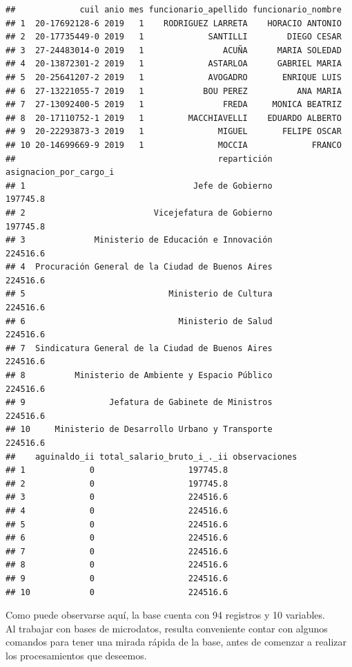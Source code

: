 \documentclass[]{book}
\begin{document}
\begin{verbatim}
##             cuil anio mes funcionario_apellido funcionario_nombre
## 1  20-17692128-6 2019   1    RODRIGUEZ LARRETA    HORACIO ANTONIO
## 2  20-17735449-0 2019   1             SANTILLI        DIEGO CESAR
## 3  27-24483014-0 2019   1                ACUÑA      MARIA SOLEDAD
## 4  20-13872301-2 2019   1             ASTARLOA      GABRIEL MARIA
## 5  20-25641207-2 2019   1             AVOGADRO       ENRIQUE LUIS
## 6  27-13221055-7 2019   1            BOU PEREZ          ANA MARIA
## 7  27-13092400-5 2019   1                FREDA     MONICA BEATRIZ
## 8  20-17110752-1 2019   1         MACCHIAVELLI    EDUARDO ALBERTO
## 9  20-22293873-3 2019   1               MIGUEL       FELIPE OSCAR
## 10 20-14699669-9 2019   1               MOCCIA             FRANCO
##                                         repartición asignacion_por_cargo_i
## 1                                  Jefe de Gobierno               197745.8
## 2                          Vicejefatura de Gobierno               197745.8
## 3              Ministerio de Educación e Innovación               224516.6
## 4  Procuración General de la Ciudad de Buenos Aires               224516.6
## 5                             Ministerio de Cultura               224516.6
## 6                               Ministerio de Salud               224516.6
## 7  Sindicatura General de la Ciudad de Buenos Aires               224516.6
## 8          Ministerio de Ambiente y Espacio Público               224516.6
## 9                 Jefatura de Gabinete de Ministros               224516.6
## 10     Ministerio de Desarrollo Urbano y Transporte               224516.6
##    aguinaldo_ii total_salario_bruto_i_._ii observaciones
## 1             0                   197745.8              
## 2             0                   197745.8              
## 3             0                   224516.6              
## 4             0                   224516.6              
## 5             0                   224516.6              
## 6             0                   224516.6              
## 7             0                   224516.6              
## 8             0                   224516.6              
## 9             0                   224516.6              
## 10            0                   224516.6
\end{verbatim}

Como puede observarse aquí, la base cuenta con 94 registros y 10 variables.\\
Al trabajar con bases de microdatos, resulta conveniente contar con algunos comandos para tener una mirada rápida de la base, antes de comenzar a realizar los procesamientos que deseemos.
\end{document}
